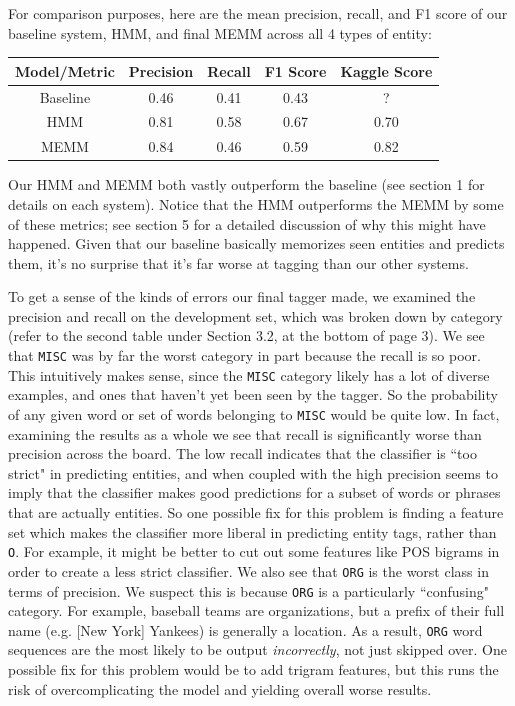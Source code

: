 \documentclass[12pt]{article}
\begin{document}
For comparison purposes, here are the mean precision, recall, and F1 score of our baseline system, HMM, and final MEMM across all 4 types of entity:
\begin{center}
	\begin{tabular}{|c|c|c|c|c|}
		\hline
		\textbf{Model/Metric} & Precision & Recall & F1 Score & Kaggle Score\\
		\hline
		Baseline & 0.46 & 0.41 & 0.43 & ?\\
		\hline
		HMM & 0.81 & 0.58 & 0.67 & 0.70\\
		\hline
		MEMM & 0.84 & 0.46 & 0.59 & 0.82\\
		\hline
	\end{tabular}
\end{center}
Our HMM and MEMM both vastly outperform the baseline (see section 1 for details on each system). Notice that the HMM outperforms the MEMM by some of these metrics; see section 5 for a detailed discussion of why this might have happened. Given that our baseline basically memorizes seen entities and predicts them, it's no surprise that it's far worse at tagging than our other systems. 

To get a sense of the kinds of errors our final tagger made, we examined the precision and recall on the development set, which was broken down by category (refer to the second table under Section 3.2, at the bottom of page 3). We see that {\tt MISC} was by far the worst category in part because the recall is so poor. This intuitively makes sense, since the {\tt MISC} category likely has a lot of diverse examples, and ones that haven't yet been seen by the tagger. So the probability of any given word or set of words belonging to {\tt MISC} would be quite low. In fact, examining the results as a whole we see that recall is significantly worse than precision across the board. The low recall indicates that the classifier is ``too strict" in predicting entities, and when coupled with the high precision seems to imply that the classifier makes good predictions for a subset of words or phrases that are actually entities. So one possible fix for this problem is finding a feature set which makes the classifier more liberal in predicting entity tags, rather than {\tt O}. For example, it might be better to cut out some features like POS bigrams in order to create a less strict classifier. We also see that {\tt ORG} is the worst class in terms of precision. We suspect this is because {\tt ORG} is a particularly ``confusing" category. For example, baseball teams are organizations, but a prefix of their full name (e.g. [New York] Yankees) is generally a location. As a result, {\tt ORG} word sequences are the most likely to be output \emph{incorrectly}, not just skipped over. One possible fix for this problem would be to add trigram features, but this runs the risk of overcomplicating the model and yielding overall worse results. 
\end{document}
